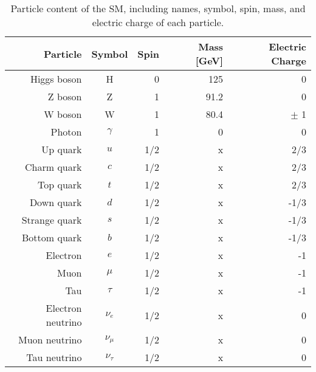 \begin{table} [htbp!]
    \centering
    \begin{tabular}{ r c r r r } \hline \hline
        Particle & Symbol & Spin & Mass [GeV] & Electric Charge \\ \hline 
        Higgs boson & H & 0 & 125 & 0 \\ \hline
        Z boson & Z & 1 & 91.2 & 0 \\ 
        W boson & W & 1 & 80.4 & $\pm$ 1 \\
        Photon & $\gamma$ & 1 & 0 & 0 \\ \hline
        Up quark & $u$ & 1/2 & x & 2/3 \\
        Charm quark & $c$ & 1/2 & x & 2/3 \\
        Top quark & $t$ & 1/2 & x & 2/3 \\
        Down quark & $d$ & 1/2 & x & -1/3 \\
        Strange quark & $s$ & 1/2 & x & -1/3 \\
        Bottom quark & $b$ & 1/2 & x & -1/3 \\ \hline
        Electron & $e$ & 1/2 & x & -1 \\
        Muon & $\mu$ & 1/2 & x & -1 \\
        Tau & $\tau$ & 1/2 & x & -1 \\
        Electron neutrino & $\nu_e$ & 1/2 & x & 0 \\
        Muon neutrino & $\nu_\mu$ & 1/2 & x & 0 \\
        Tau neutrino & $\nu_\tau$ & 1/2 & x & 0 \\ \hline \hline
    \end{tabular}
    \caption{Particle content of the SM, including names, symbol, spin, mass, and electric charge of each particle.}
    \label{tab:sm_particles}
\end{table}

